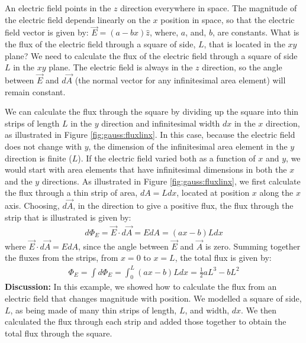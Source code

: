 \begin{example}{An electric field points in the $z$ direction everywhere in space. The magnitude of the electric field depends linearly on the $x$ position in space, so that the electric field vector is given by: $\vec E=(a-bx)\hat z$, where, $a$, and, $b$, are constants. What is the flux of the electric field through a square of side, $L$, that is located in the $xy$ plane?}
We need to calculate the flux of the electric field through a square of side $L$ in the $xy$ plane. The electric field is always in the $z$ direction, so the angle between $\vec E$ and $d\vec A$ (the normal vector for any infinitesimal area element) will remain constant.

We can calculate the flux through the square by dividing up the square into thin strips of length $L$ in the $y$ direction and infinitesimal width $dx$ in the $x$ direction, as illustrated in Figure \ref{fig:gauss:fluxlinx}. In this case, because the electric field does not change with $y$, the dimension of the infinitesimal area element in the $y$ direction is finite ($L$). If the electric field varied both as a function of $x$ and $y$, we would start with area elements that have infinitesimal dimensions in both the $x$ and the $y$ directions. 
As illustrated in Figure \ref{fig:gauss:fluxlinx}, we first calculate the flux through a thin strip of area, $dA=Ldx$, located at position $x$ along the $x$ axis. Choosing, $d\vec A$, in the direction to give a positive flux, the flux through the strip that is illustrated is given by:
\begin{align*}
d\Phi_E=\vec E\cdot d\vec A=EdA=(ax-b)Ldx
\end{align*}
where $\vec E\cdot d\vec A=EdA$, since the angle between $\vec E$ and $\vec A$ is zero. Summing together the fluxes from the strips, from $x=0$ to $x=L$, the total flux is given by:
\begin{align*}
\Phi_E=\int d\Phi_E=\int_0^L(ax-b)Ldx=\frac{1}{2}aL^3-bL^2
\end{align*}
\textbf{Discussion:} In this example, we showed how to calculate the flux from an electric field that changes magnitude with position. We modelled a square of side, $L$, as being made of many thin strips of length, $L$, and width, $dx$. We then calculated the flux through each strip and added those together to obtain the total flux through the square.
\end{example}
